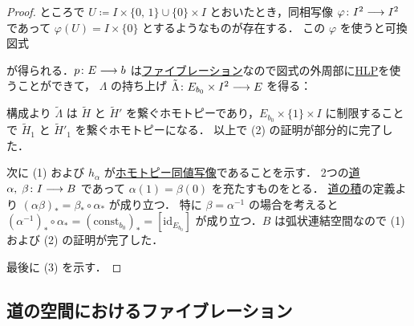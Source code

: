 \documentclass[algtopo_main]{subfiles}
\begin{document}
\begin{proof}
    ところで $U \coloneqq I \times \{0,\, 1\} \cup \{0\} \times I$ とおいたとき，同相写像 $\varphi \colon I^2 \longrightarrow I^2$ であって $\varphi(U) = I \times \{0\}$ とするようなものが存在する．
    この $\varphi$ を使うと可換図式
    \begin{center}
    \end{center}
    が得られる．$p \colon E \longrightarrow b$ は\hyperref[def:fibration]{ファイブレーション}なので図式の外周部に\hyperref[def:HLP]{HLP}を使うことができて，
    $\Lambda$ の持ち上げ $\tilde{\Lambda} \colon E_{b_0} \times I^2 \longrightarrow E$ を得る：
    \begin{center}
    \end{center}
    構成より $\tilde{\Lambda}$ は $\tilde{H}$ と $\tilde{H}'$ を繋ぐホモトピーであり，$E_{b_0} \times \{1\} \times I$ に制限することで $\tilde{H}_1$ と $\tilde{H}'_1$ を繋ぐホモトピーになる．
    以上で (2) の証明が部分的に完了した．
    
    次に (1) および $h_\alpha$ が\hyperref[def:homotopy-basic]{ホモトピー同値写像}であることを示す．
    2つの\hyperref[def:path-basic]{道} $\alpha,\; \beta \colon I \longrightarrow B$ であって $\alpha(1) = \beta(0)$ を充たすものをとる．
    \hyperref[def:path-basic]{道の積}の定義より $(\alpha \beta)_* = \beta_* \circ \alpha_*$ が成り立つ．
    特に $\beta = \alpha^{-1}$ の場合を考えると $(\alpha^{-1})_* \circ \alpha_* = (\mathrm{const}_{b_0})_* = [\mathrm{id}_{E_{b_0}}]$ が成り立つ．$B$ は弧状連結空間なので (1) および (2) の証明が完了した．

    最後に (3) を示す．
\end{proof}

\subsection{道の空間におけるファイブレーション}
\end{document}
